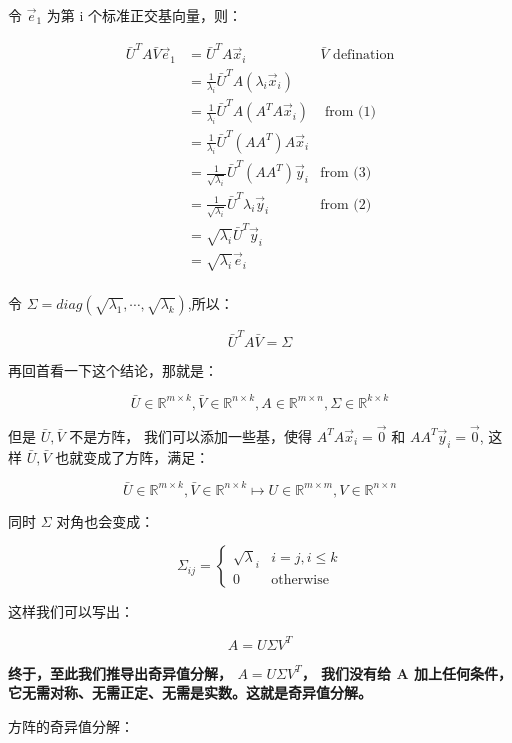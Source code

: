 \documentclass[
]{book}
\begin{document}
令 \(\vec{e}_1\) 为第 i 个标准正交基向量，则：

\[
\begin{aligned}
\bar{U}^T A \bar{V} \vec{e}_1{} &=  \bar{U}^T A \vec{x}_i & \bar{V} \text{ defination} \\
&=  \frac{1}{\lambda_i} \bar{U}^T A (\lambda_i \vec{x}_i) \\
&= \frac{1}{\lambda_i} \bar{U}^T A (A^TA \vec{x}_i)  & \text{ from (1)} \\
&= \frac{1}{\lambda_i} \bar{U}^T (AA^T) A \vec{x}_i \\
&= \frac{1}{\sqrt{\lambda_i}} \bar{U}^T (AA^T) \vec{y}_i & \text{from (3)}\\ 
&= \frac{1}{\sqrt{\lambda_i}} \bar{U}^T \lambda_i \vec{y}_i & \text{from (2)}  \\
&= \sqrt{\lambda_i}  \bar{U}^T  \vec{y}_i \\
&= \sqrt{\lambda_i}\vec{e}_i \\
\end{aligned}
\]

令 \(\Sigma = diag (\sqrt{\lambda_1}, \cdots, \sqrt{\lambda_k})\),所以：

\[\bar{U}^T A \bar{V} = \Sigma\]

再回首看一下这个结论，那就是：

\[\bar{U} \in \mathbb{R}^{m \times k},  \bar{V} \in \mathbb{R}^{n \times k},  A \in \mathbb{R}^{m \times n}, \Sigma \in \mathbb{R}^{k \times k} \]

但是 \(\bar{U}, \bar{V}\) 不是方阵， 我们可以添加一些基，使得 \(A^TA\vec{x}_i = \vec{0}\) 和 \(AA^T\vec{y}_i = \vec{0}\), 这样 \(\bar{U}, \bar{V}\) 也就变成了方阵，满足：

\[\bar{U} \in \mathbb{R}^{m \times k},  \bar{V} \in \mathbb{R}^{n \times k}\mapsto U \in \mathbb{R}^{m \times m}, V \in \mathbb{R}^{n \times n} \]

同时 \(\Sigma\) 对角也会变成：

\[
\Sigma_{ij} = \begin{cases}
\sqrt{\lambda}_i & i = j, i \le k\\
0 & \text{otherwise}
\end{cases}
\]

这样我们可以写出：

\[A = U \Sigma V^T\]

\textbf{终于，至此我们推导出奇异值分解， \(A = U \Sigma V^T\)， 我们没有给 A 加上任何条件，它无需对称、无需正定、无需是实数。这就是奇异值分解。}

方阵的奇异值分解：
\end{document}
